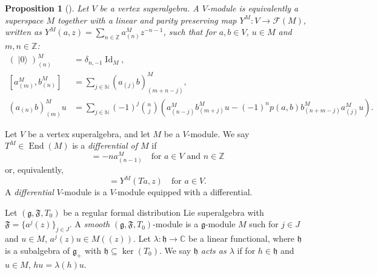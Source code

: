 \documentclass[a4paper, 12pt, reqno]{amsart}
\newtheorem{proposition}[theorem]{Proposition}
\theoremstyle{remark}
\DeclareMathOperator{\Id}{Id}
\DeclareMathOperator{\End}{End}
\DeclareMathOperator{\vac}{|0\rangle}
\begin{document}
\begin{proposition}[{\cite[\S3]{dong_twisted_1998}}]
  \label{prp:9}
  Let $V$ be a vertex superalgebra.
  A $V$-module is equivalently a superspace $M$ together with a linear and parity preserving map $Y^M: V \to \mathcal{F}(M)$, written as $Y^M(a, z) = \sum_{n \in \mathbb{Z}}a^M_{(n)}z^{-n - 1}$, such that for $a, b \in V$, $u \in M$ and $m, n \in \mathbb{Z}$:
  \begin{align}
    \label{eq:23}
    (\vac)^M_{(n)} &= \delta_{n, -1}\Id_M, \\
    \label{eq:24}
    [a^M_{(m)}, b^M_{(n)}] &= \sum_{j \in \mathbb{N}}(a_{(j)}b)^M_{(m + n - j)}, \\
    \label{eq:25}
    (a_{(n)}b)^M_{(m)}u &= \sum_{j \in \mathbb{N}}(-1)^j\binom{n}{j}(a^M_{(n - j)}b^M_{(m + j)}u - (-1)^np(a, b)b^M_{(n + m - j)}a^M_{(j)}u).
  \end{align}
\end{proposition}

Let $V$ be a vertex superalgebra, and let $M$ be a $V$-module.
We say  $T^M \in \End(M)$ is a \emph{differential of $M$} if
\begin{equation*}
  [T^M, a^M_{(n)}] = -na^M_{(n - 1)} \quad \text{for $a \in V$ and $n \in \mathbb{Z}$}
\end{equation*}
or, equivalently,
\begin{equation*}
  [T^M, Y^M(a, z)] = Y^M(Ta, z) \quad \text{for $a \in V$}.
\end{equation*}
A \emph{differential} $V$-module is a $V$-module equipped with a differential.

Let $(\mathfrak{g}, \mathfrak{F}, T_0)$ be a regular formal distribution Lie superalgebra with $\mathfrak{F} = \{a^j(z)\}_{j \in J}$.
A \emph{smooth} $(\mathfrak{g}, \mathfrak{F}, T_0)$-module is a $\mathfrak{g}$-module $M$ such for $j \in J$ and $u \in M$, $a^j(z)u \in M((z))$.
Let $\lambda: \mathfrak{h} \to \mathbb{C}$ be a linear functional, where $\mathfrak{h}$ is a subalgebra of $\mathfrak{g}_+$ with $\mathfrak{h} \subseteq \ker(T_0)$.
We say $\mathfrak{h}$ \emph{acts as $\lambda$} if for $h \in \mathfrak{h}$ and $u \in M$, $hu = \lambda(h)u$.
\end{document}
